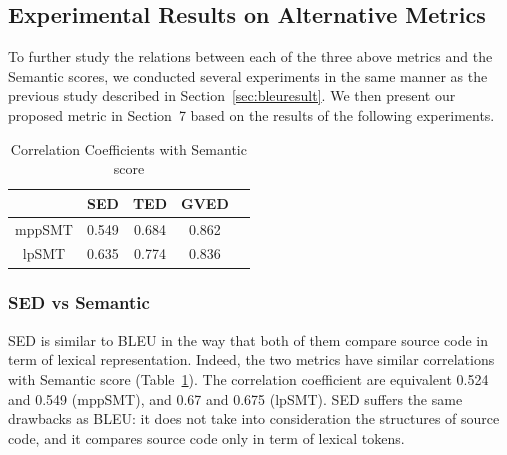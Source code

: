 \subsection{Experimental Results on Alternative Metrics}

To further study the relations between each of the three above metrics
and the Semantic scores, we conducted several experiments in the same
manner as the previous study described in
Section~\ref{sec:bleuresult}. We then present our proposed metric
in Section~7 based on the results of the following experiments.


\begin{table}
\caption{Correlation Coefficients with Semantic score}
\begin{tabular}{|c|c|c|c|c|}
\hline
 & SED & TED & GVED\\
\hline
mppSMT  & 0.549 & 0.684 & 0.862 \\
lpSMT  & 0.635 & 0.774 & 0.836 \\
\hline
\end{tabular}
\label{table:correlation}
\end{table}


\subsubsection{\textbf{SED vs Semantic}}

SED is similar to BLEU in the way that both of them compare source
code in term of lexical representation. Indeed, the two metrics have
similar correlations with Semantic score
(Table~\ref{table:correlation}). The correlation coefficient are
equivalent 0.524 and 0.549 (mppSMT), and 0.67 and 0.675 (lpSMT). SED
suffers the same drawbacks as BLEU: it does not take into
consideration the structures of source code, and it compares source
code only in term of lexical tokens. 

%

